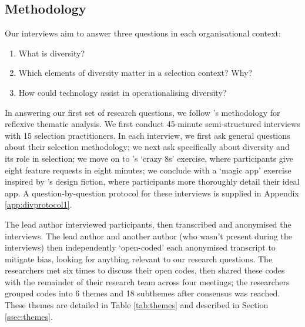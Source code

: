 \subsection{Methodology}\label{ssec:methods1}
Our interviews aim to answer three questions in each organisational context:

\begin{enumerate}
    \item What is diversity?
    \item Which elements of diversity matter in a selection context? Why?
    \item How could technology assist in operationalising diversity?
\end{enumerate}

In answering our first set of research questions, we follow \textcite{braun_using_2006}'s methodology for reflexive thematic analysis. We first conduct 45-minute semi-structured interviews with 15 selection practitioners. In each interview, we first ask general questions about their selection methodology; we next ask specifically about diversity and its role in selection; we move on to \textcite{Knapp_Zeratzky_Kowitz_2016}'s `crazy 8s' exercise, where participants give eight feature requests in eight minutes; we conclude with a `magic app' exercise inspired by \textcite{blythe2014research}'s design fiction, where participants more thoroughly detail their ideal app. A question-by-question protocol for these interviews is supplied in Appendix \ref{app:divprotocol1}.

The lead author interviewed participants, then transcribed and anonymised the interviews. The lead author and another author (who wasn't present during the interviews) then independently `open-coded' each anonymised transcript to mitigate bias, looking for anything relevant to our research questions. The researchers met six times to discuss their open codes, then shared these codes with the remainder of their research team across four meetings; the researchers grouped codes into 6 themes and 18 subthemes after consensus was reached. These themes are detailed in Table \ref{tab:themes} and described in Section \ref{ssec:themes}.


